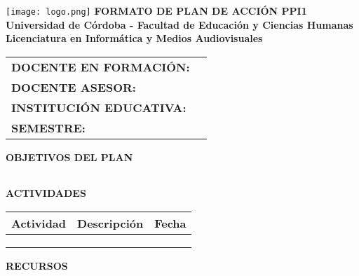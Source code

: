 \documentclass[a4paper,12pt]{article}
\begin{document}
\begin{center}
    \vspace*{1cm}
    \texttt{[image: logo.png]} %
    \vspace{0.5cm}
    \textbf{\Large FORMATO DE PLAN DE ACCIÓN PPI1} \\
    \vspace{0.5cm}
    \textbf{Universidad de Córdoba - Facultad de Educación y Ciencias Humanas} \\
    \textbf{Licenciatura en Informática y Medios Audiovisuales}
\end{center}

\vspace{0.5cm}
\begin{tabularx}{\textwidth}{@{}p{5cm}X@{}}
    \toprule
    \textbf{DOCENTE EN FORMACIÓN:} & \hrulefill \\
    \textbf{DOCENTE ASESOR:} & \hrulefill \\
    \textbf{INSTITUCIÓN EDUCATIVA:} & \hrulefill \\
    \textbf{SEMESTRE:} & \hrulefill \\
    \bottomrule
\end{tabularx}

\vspace{0.5cm}
\noindent
\textbf{OBJETIVOS DEL PLAN}
\begin{tabularx}{\textwidth}{|X|}
    \hline
    \vspace{2cm} \\ \hline
\end{tabularx}

\vspace{0.5cm}
\noindent
\textbf{ACTIVIDADES}
\begin{table}[h]
    \centering
    \scriptsize
    \begin{tabularx}{\textwidth}{|X|X|c|}
        \hline
        \textbf{Actividad} & \textbf{Descripción} & \textbf{Fecha} \\
        \hline
        & & \\ \hline
        & & \\ \hline
        & & \\ \hline
    \end{tabularx}
\end{table}

\vspace{0.5cm}
\noindent
\textbf{RECURSOS}
\begin{tabularx}{\textwidth}{|X|}
    \hline
    \vspace{2cm} \\ \hline
\end{tabularx}
\end{document}
